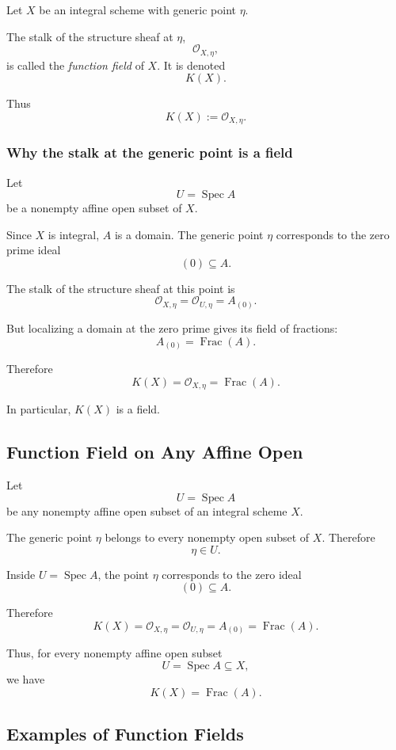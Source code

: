 \documentclass[12pt,a4paper]{article}
\theoremstyle{notespace}
\begin{document}
Let \(X\) be an integral scheme with generic point \(\eta\).

The stalk of the structure sheaf at \(\eta\),
\[
\mathcal{O}_{X,\eta},
\]
is called the \emph{function field} of \(X\). It is denoted
\[
K(X).
\]

Thus
\[
K(X):=\mathcal{O}_{X,\eta}.
\]

\subsubsection*{Why the stalk at the generic point is a field}

Let
\[
U=\operatorname{Spec}A
\]
be a nonempty affine open subset of \(X\).

Since \(X\) is integral, \(A\) is a domain. The generic point \(\eta\) corresponds to the zero prime ideal
\[
(0)\subseteq A.
\]

The stalk of the structure sheaf at this point is
\[
\mathcal{O}_{X,\eta}
=
\mathcal{O}_{U,\eta}
=
A_{(0)}.
\]

But localizing a domain at the zero prime gives its field of fractions:
\[
A_{(0)}=\operatorname{Frac}(A).
\]

Therefore
\[
K(X)=\mathcal{O}_{X,\eta}=\operatorname{Frac}(A).
\]

In particular, \(K(X)\) is a field.

\subsection{Function Field on Any Affine Open}

Let
\[
U=\operatorname{Spec}A
\]
be any nonempty affine open subset of an integral scheme \(X\).

The generic point \(\eta\) belongs to every nonempty open subset of \(X\). Therefore
\[
\eta\in U.
\]

Inside \(U=\operatorname{Spec}A\), the point \(\eta\) corresponds to the zero ideal
\[
(0)\subseteq A.
\]

Therefore
\[
K(X)
=
\mathcal{O}_{X,\eta}
=
\mathcal{O}_{U,\eta}
=
A_{(0)}
=
\operatorname{Frac}(A).
\]

Thus, for every nonempty affine open subset
\[
U=\operatorname{Spec}A\subseteq X,
\]
we have
\[
\boxed{
	K(X)=\operatorname{Frac}(A).
}
\]

\subsection{Examples of Function Fields}
\end{document}
